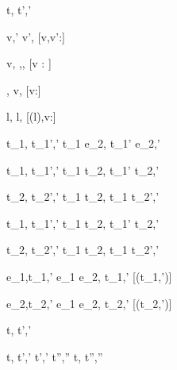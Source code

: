 
  {t,\sigma {} t',\sigma'}


  { }
  {\Update v,\sigma {}' \Update v',\sigma}
  [v,v':\tau]

  { }
  {\Update v,\sigma \handle{\Empty} \Enter \tau,\sigma,\True}
  [v : \tau]

  { }
  {\Enter \tau,\sigma {} \Update v,\sigma}
  [v:\tau]

  { }
  {\Update l,\sigma {} \Update l,\sigma[l \mapsto v]}
  [\sigma(l),v:\tau]

  {t_1,\sigma {} t_1',\sigma'}
  {t_1 \Step e_2,\sigma {} t_1' \Step e_2,\sigma'}




  {t_1,\sigma {} t_1',\sigma'}
  {t_1 \Pair t_2,\sigma {} t_1' \Pair t_2,\sigma'}

  {t_2,\sigma {} t_2',\sigma'}
  {t_1 \Pair t_2,\sigma {} t_1 \Pair t_2',\sigma'}


  {t_1,\sigma {} t_1',\sigma'}
  {t_1 \Choose t_2,\sigma {} t_1' \Choose t_2,\sigma'}

  {t_2,\sigma {} t_2',\sigma' }
  {t_1 \Choose t_2,\sigma {} t_1 \Choose t_2',\sigma'}


  {e_1,\sigma \normalise t_1,\sigma'}
  {e_1 \Pick e_2,\sigma \xrightarrow[]{\Left} t_1,\sigma'}
  [\neg\Failing(t_1,\sigma')]

  {e_2,\sigma \normalise t_2,\sigma'}
  {e_1 \Pick e_2,\sigma \xrightarrow[]{\Right} t_2,\sigma'}
  [\neg\Failing(t_2,\sigma')]




  {t,\sigma {} t',\sigma'}



  {t,\sigma {} t',\sigma' \Quad
   t',\sigma' \normalise t'',\sigma''}
  {t,\sigma {} t'',\sigma''}
